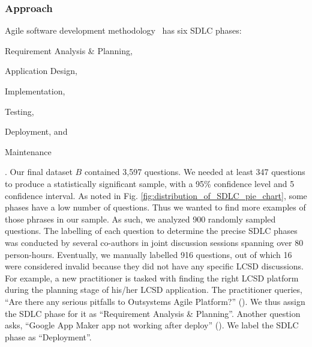 \subsubsection{Approach}
Agile software development methodology~\cite{beck2001manifesto} has six SDLC phases:  \begin{inparaenum}[(1)]
\item Requirement Analysis \& Planning, 
\item Application Design,
\item Implementation, 
\item Testing,
\item Deployment, and
\item Maintenance\end{inparaenum}.
Our final dataset $B$ contained 3,597 questions. We needed at least 347 questions to produce a statistically significant sample, with a 95\% confidence level and 5 confidence interval. As noted in Fig. \ref{fig:distribution_of_SDLC_pie_chart}, some phases have a low number of questions. Thus we wanted to find more examples of those phrases in our sample. As such, we analyzed 900 randomly sampled questions. The labelling of each question to determine the precise SDLC phases was conducted by several co-authors in joint discussion sessions spanning over 80 person-hours. Eventually, we manually labelled 916 questions, out of which 16 were considered invalid because they did not have any specific LCSD discussions. For example, a new practitioner is tasked with finding the right LCSD platform during the planning stage of his/her LCSD application. The practitioner queries, ``Are there any serious pitfalls to Outsystems Agile Platform?'' (). We thus assign the SDLC phase for it as ``Requirement Analysis \& Planning''. Another question asks, ``Google  App  Maker  app  not  working  after  deploy'' (). We label the SDLC phase as ``Deployment''. 


